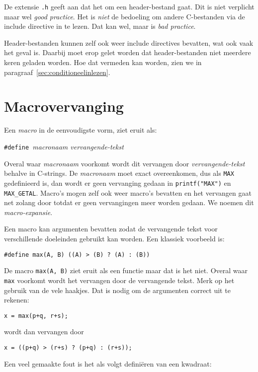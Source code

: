 De extensie \texttt{.h} geeft aan dat het om een header-bestand gaat. Dit is niet verplicht maar wel \textsl{good practice}. Het is \textsl{niet} de bedoeling om andere C-bestanden via de include directive in te lezen. Dat kan wel, maar is \textsl{bad practice}.

Header-bestanden kunnen zelf ook weer include directives bevatten, wat ook vaak het geval is. Daarbij moet erop gelet  worden dat header-bestanden niet meerdere keren geladen worden. Hoe dat vermeden kan worden, zien we in paragraaf~\ref{sec:conditioneelinlezen}.


\section{Macrovervanging}
Een \textsl{macro} in de eenvoudigste vorm, ziet eruit als:

\hspace*{1em}\texttt{\#define }\textsl{macronaam vervangende-tekst}

Overal waar \textsl{macronaam} voorkomt wordt dit vervangen door \textsl{vervangende-tekst} behalve in C-strings. De \textsl{macronaam} moet exact overeenkomen, dus als \texttt{MAX} gedefinieerd is, dan wordt er geen vervanging gedaan in \texttt{printf("{}MAX")} en \texttt{MAX\_GETAL}. Macro's mogen zelf ook weer macro's bevatten en het vervangen gaat net zolang door totdat er geen vervangingen meer worden gedaan. We noemen dit \textsl{macro-expansie}.

Een macro kan argumenten bevatten zodat de vervangende tekst voor verschillende doeleinden gebruikt kan worden. Een klassiek voorbeeld is:

\hspace*{1em}\texttt{\#define max(A, B) ((A) > (B) ? (A) : (B))}

De macro \texttt{max(A, B)} ziet eruit als een functie maar dat is het niet. Overal waar \texttt{max} voorkomt wordt het vervangen door de vervangende tekst. Merk op het gebruik van de vele haakjes. Dat is nodig om de argumenten correct uit te rekenen:

\hspace*{1em}\texttt{x = max(p+q, r+s);}

wordt dan vervangen door

\hspace*{1em}\texttt{x = ((p+q) > (r+s) ? (p+q) : (r+s));}

Een veel gemaakte fout is het als volgt definiëren van een kwadraat:

